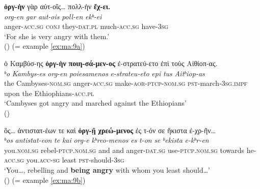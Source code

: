 \documentclass[output=paper,colorlinks,citecolor=brown]{langscibook}
\begin{document}

\ea\label{ex:ma:11}

\ea\label{ex:ma:11a}

\glll\textbf{ὀργ-ὴν} γὰρ αὐτ-οῖς\ldots{} πολλ-ὴν \textbf{ἔχ-ει.}\\
 \textit{org-en} \textit{gar} \textit{aut-ois} \textit{poll-en} \textit{ekʰ-ei}\\
anger-\textsc{acc.sg} \textsc{conj} they-\textsc{dat.pl} much-\textsc{acc.sg} have-\textsc{3sg}\\
\glt `For she is very angry with them.' \\
\hspace*{\fill}() (= example \ref{ex:ma:9a})

\ex\label{ex:ma:11b}

\glll ὁ Καμβύσ-ης \textbf{ὀργ-ὴν} \textbf{ποιη-σά-μεν-ος} ἐ-στρατεύ-ετο ἐπὶ τοὺς Αἰθίοπ-ας.\\
 \textit{ʰo} \textit{Kambys-es} \textit{org-en} \textit{poiesamenos} \textit{e-strateu-eto} \textit{epi} \textit{tus} \textit{Aitʰiop-as}\\
the Cambyses-\textsc{nom.sg} anger-\textsc{acc.sg} make-\textsc{aor-ptcp-nom.sg}
\textsc{pst-}march-\textsc{3sg.impf} upon the Ethiophians-\textsc{acc.pl}\\
\glt `Cambyses got angry and marched against the Ethiopians' \\
\hspace*{\fill}()

\ex\label{ex:ma:11c}

\glll ὃς\ldots{} ἀντιστατ-έων τε καὶ \textbf{ὀργ-ῇ} \textbf{χρεώ-μενος} ἐς τ-όν σε ἥκιστα ἐ-χρ-ῆν\ldots{}\\
 \textit{ʰos} \textit{antistat-eon} \textit{te} \textit{kai} \textit{org-e} \textit{kʰreo-menos} \textit{es} \textit{t-on} \textit{se} \textit{ʰekista} \textit{e-kʰr-en}\\
you.\textsc{nom.sg} rebel-\textsc{ptcp.nom.sg} and and anger-\textsc{dat.sg}
use-\textsc{ptcp.nom.sg} towards he-\textsc{acc.sg} you.\textsc{acc-sg} least \textsc{pst-}should-\textsc{3sg}\\
\glt `You\ldots, rebelling and \textbf{being angry} with whom you least should\ldots' \\
\hspace*{\fill}() (= example \ref{ex:ma:9b})

\z

\z
\end{document}
